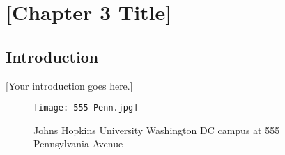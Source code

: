\chapter{[Chapter 3 Title]}
\label{ch:chapter3}

\section{Introduction}

[Your introduction goes here.]

\begin{figure}[h]
    \centering
    \texttt{[image: 555-Penn.jpg]}
    \caption{Johns Hopkins University Washington DC campus at 555 Pennsylvania Avenue}
    \label{fig:penn555}
\end{figure}



